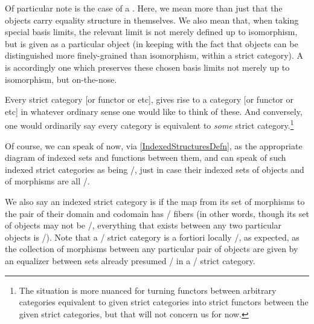 \begin{definition}
Of particular note is the case of a . Here, we mean more than just that the objects carry equality structure in themselves. We also mean that, when taking special basis limits, the relevant limit is not merely defined up to isomorphism, but is given as a particular object (in keeping with the fact that objects can be distinguished more finely-grained than isomorphism, within a strict category). A  is accordingly one which preserves these chosen basis limits not merely up to isomorphism, but on-the-nose. 
\end{definition}

Every strict category [or functor or etc], gives rise to a category [or functor or etc] in whatever ordinary sense one would like to think of these. And conversely, one would ordinarily say every category is equivalent to \emph{some} strict category.\footnote{The situation is more nuanced for turning functors between arbitrary categories equivalent to given strict categories into strict functors between the given strict categories, but that will not concern us for now.}

\begin{definition}
Of course, we can speak of  now, via \cref{IndexedStructuresDefn}, as the appropriate diagram of indexed sets and functions between them, and can speak of such indexed strict categories as being \repsmall/, just in case their indexed sets of objects and of morphisms are all \repsmall/.
\end{definition}

\begin{definition}
We also say an indexed strict category is  if the map from its set of morphisms to the pair of their domain and codomain has \repsmall/ fibers (in other words, though its set of objects may not be \repsmall/, everything that exists between any two particular objects is \repsmall/). Note that a \repsmall/ strict category is a fortiori locally \repsmall/, as expected, as the collection of morphisms between any particular pair of objects are given by an equalizer between sets already presumed \repsmall/ in a \repsmall/ strict category.
\end{definition}


